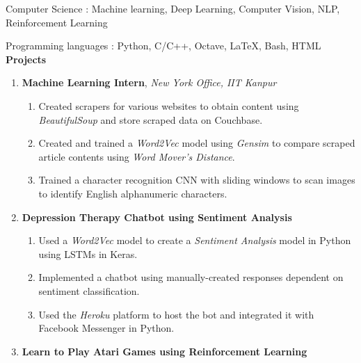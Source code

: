 \documentclass{article}
\begin{document}
    Computer Science \hspace{12.3mm}: \hspace{1mm} Machine learning, Deep Learning, Computer Vision, NLP, Reinforcement Learning\par
    Programming languages \hspace{3mm}: \hspace{1mm} Python, C/C++, Octave, \LaTeX, Bash, HTML\\[+1mm]

    \textbf{Projects}
    \begin{enumerate}[leftmargin=12.5mm]
        \item \textbf{Machine Learning Intern}, \textit{New York Office, IIT Kanpur}
            \begin{enumerate}
                \setlength\itemsep{0em}
                \small
                
                \item Created scrapers for various websites to obtain content using {\it BeautifulSoup} and store scraped data on Couchbase.
                \item Created and trained a {\it Word2Vec} model using {\it Gensim} to compare scraped article contents using {\it Word Mover's Distance}.
                \item Trained a character recognition CNN with sliding windows to scan images to identify English alphanumeric characters.
            \end{enumerate}
        \item \textbf{Depression Therapy Chatbot using Sentiment Analysis}
            \begin{enumerate}
                \setlength\itemsep{0em}
                \small
            
                \item Used a {\it Word2Vec} model to create a {\it Sentiment Analysis} model in Python using LSTMs in Keras.
                \item Implemented a chatbot using manually-created responses dependent on sentiment classification.
                \item Used the {\it Heroku} platform to host the bot and integrated it with Facebook Messenger in Python.
            \end{enumerate}
        \item \textbf{Learn to Play Atari Games using Reinforcement Learning}
            \begin{enumerate}
                \setlength\itemsep{0em}
                \small
                

\end{enumerate}
\end{enumerate}
\end{document}
